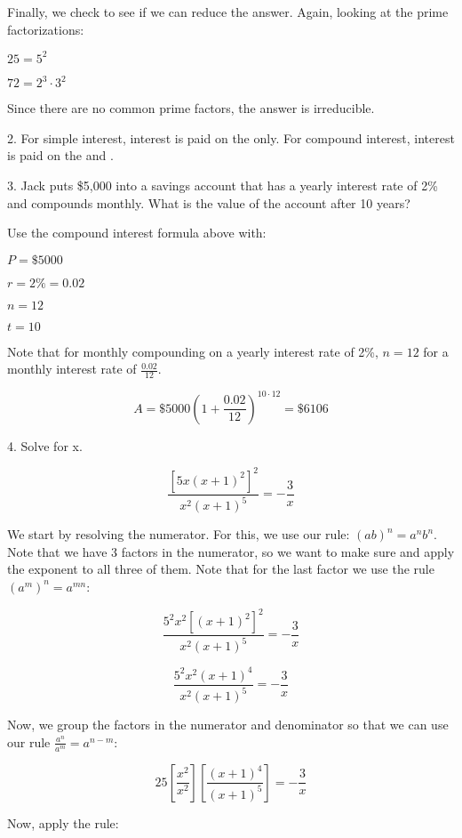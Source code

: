 \documentclass[letterpaper, 12pt]{article}
\begin{document}
Finally, we check to see if we can reduce the answer.  Again, looking at the
prime factorizations:

\bigskip

$25=5^2$

$72=2^3\cdot3^2$

\bigskip

Since there are no common prime factors, the answer is irreducible.

\bigskip

2. For simple interest, interest is paid on the  only.  For
compound interest, interest is paid on the  and
.

3. Jack puts \$5,000 into a savings account that has a yearly interest rate of
2\% and compounds monthly.  What is the value of the account after 10 years?

Use the compound interest formula above with:

\bigskip

$P=\$5000$

$r=2\%=0.02$

$n=12$

$t=10$

\bigskip

Note that for monthly compounding on a yearly interest rate of 2\%, $n=12$ for a
monthly interest rate of $\frac{0.02}{12}$.

\[A=\$5000\left(1+\frac{0.02}{12}\right)^{10\cdot12}=\$6106\]


4. Solve for x.

\[\frac{\left[5x\left(x+1\right)^2\right]^2}{x^2(x+1)^5}=-\frac{3}{x}\]

We start by resolving the numerator.  For this, we use our rule:
$(ab)^n=a^nb^n$.  Note that we have 3 factors in the numerator, so we want to
make sure and apply the exponent to all three of them.  Note that for the last
factor we use the rule $(a^m)^n=a^{mn}$:

\[\frac{5^2x^2\left[\left(x+1\right)^2\right]^2}{x^2(x+1)^5}=-\frac{3}{x}\]

\[\frac{5^2x^2\left(x+1\right)^4}{x^2(x+1)^5}=-\frac{3}{x}\]

Now, we group the factors in the numerator and denominator so that we can use
our rule $\frac{a^n}{a^m}=a^{n-m}$:

\[25\left[\frac{x^2}{x^2}\right]\left[\frac{(x+1)^4}{(x+1)^5}\right]=
-\frac{3}{x}\]

Now, apply the rule:
\end{document}
